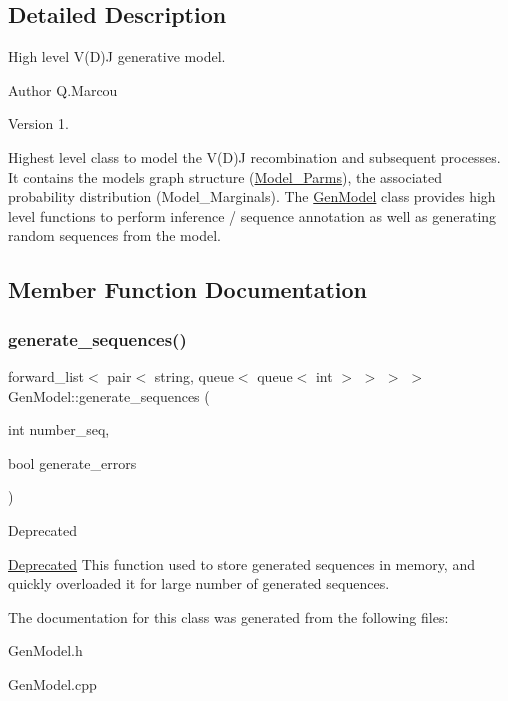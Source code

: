\subsection{Detailed Description}
High level V(\+D)J generative model. 

\begin{DoxyAuthor}{Author}
Q.\+Marcou 
\end{DoxyAuthor}
\begin{DoxyVersion}{Version}
1.
\end{DoxyVersion}
Highest level class to model the V(\+D)J recombination and subsequent processes. It contains the model\textquotesingle{}s graph structure (\hyperlink{classModel__Parms}{Model\+\_\+\+Parms}), the associated probability distribution (Model\+\_\+\+Marginals). The \hyperlink{classGenModel}{Gen\+Model} class provides high level functions to perform inference / sequence annotation as well as generating random sequences from the model. 

\subsection{Member Function Documentation}
\mbox{\label{classGenModel_a72c20c4c6d81b5c464bffad5acd36286}} 
\subsubsection{\texorpdfstring{generate\+\_\+sequences()}{generate\_sequences()}}
{\footnotesize\ttfamily forward\+\_\+list$<$ pair$<$ string, queue$<$ queue$<$ int $>$ $>$ $>$ $>$ Gen\+Model\+::generate\+\_\+sequences (\begin{DoxyParamCaption}\item[{int}]{number\+\_\+seq,  }\item[{bool}]{generate\+\_\+errors }\end{DoxyParamCaption})}

\begin{DoxyRefDesc}{Deprecated}
\item[\hyperlink{deprecated__deprecated000001}{Deprecated}]This function used to store generated sequences in memory, and quickly overloaded it for large number of generated sequences. \end{DoxyRefDesc}


The documentation for this class was generated from the following files\+:\begin{DoxyCompactItemize}
\item 
Gen\+Model.\+h\item 
Gen\+Model.\+cpp\end{DoxyCompactItemize}
